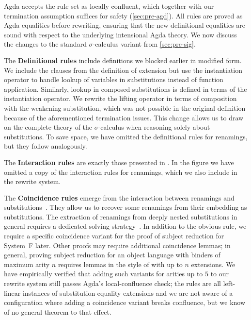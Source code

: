 \documentclass[a4paper,UKenglish,cleveref, autoref, thm-restate,anonymous]{lipics-v2021}
\begin{document}
Agda accepts the rule set as locally confluent, which together with our
termination assumption suffices for safety
(\cref{sec:pre-agd}). All rules are proved as Agda equalities before
rewriting, ensuring that the new definitional equalities are sound with
respect to the underlying intensional Agda theory. We now discuss the changes
to the standard $σ$-calculus variant from \cref{sec:pre-sig}.

The \textbf{Definitional rules} include definitions we blocked earlier in
modified form. We include the clauses from the definition of extension but use
the instantiation operator to handle lookup of variables in substitutions
instead of function application. Similarly, lookup in composed substitutions is
defined in terms of the instantiation operator. We rewrite the lifting operator
in terms of composition with the weakening substitution, which was not possible
in the original definition because of the aforementioned termination issues.
This change allows us to draw on the complete theory of the $σ$-calculus when
reasoning solely about substitutions. To save space, we have omitted the
definitional rules for renamings, but they follow analogously.

The \textbf{Interaction rules} are exactly those presented in
. In the figure we have omitted a copy of the interaction
rules for renamings, which we also include in the rewrite system.

The \textbf{Coincidence rules} emerge from the interaction between renamings
and substitutions~\cite{10.1145/3293880.3294101}. They allow us to recover some
renamings from their embedding as substitutions. The extraction of renamings
from deeply nested substitutions in general requires a dedicated solving
strategy~\cite{10.1145/3293880.3294101}. In addition to the obvious
 rule, we require a specific coincidence variant
 for the proof of subject reduction for System~F
later. Other proofs may require additional coincidence lemmas; in general,
proving subject reduction for an object language with binders of maximum arity
$n$ requires lemmas in the style of  with up to
$n$ extensions. We have empirically verified that adding such variants for
arities up to $5$ to our rewrite system still passes Agda's local-confluence
check; the rules are all left-linear instances of substitution-equality
extensions and we are not aware of a configuration where adding a coincidence
variant breaks confluence, but we know of no general theorem to that effect.
\end{document}

